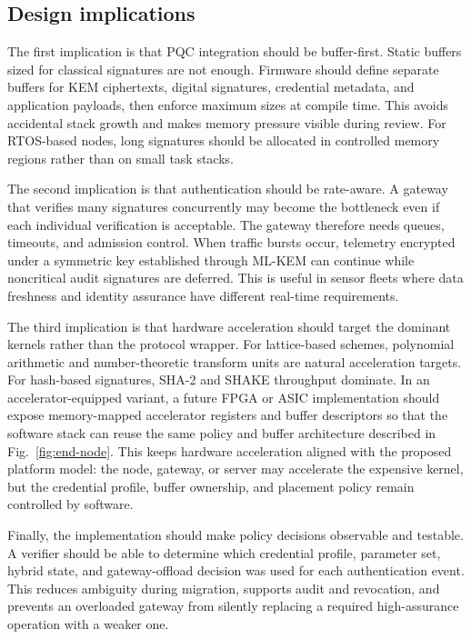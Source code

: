 \documentclass[conference,10pt,letterpaper]{IEEEtran}
\begin{document}
\subsection{Design implications}

The first implication is that PQC integration should be buffer-first. Static buffers sized for classical signatures are not enough. Firmware should define separate buffers for KEM ciphertexts, digital signatures, credential metadata, and application payloads, then enforce maximum sizes at compile time. This avoids accidental stack growth and makes memory pressure visible during review. For RTOS-based nodes, long signatures should be allocated in controlled memory regions rather than on small task stacks.

The second implication is that authentication should be rate-aware. A gateway that verifies many signatures concurrently may become the bottleneck even if each individual verification is acceptable. The gateway therefore needs queues, timeouts, and admission control. When traffic bursts occur, telemetry encrypted under a symmetric key established through ML-KEM can continue while noncritical audit signatures are deferred. This is useful in sensor fleets where data freshness and identity assurance have different real-time requirements.

The third implication is that hardware acceleration should target the dominant kernels rather than the protocol wrapper. For lattice-based schemes, polynomial arithmetic and number-theoretic transform units are natural acceleration targets. For hash-based signatures, SHA-2 and SHAKE throughput dominate. In an accelerator-equipped variant, a future FPGA or ASIC implementation should expose memory-mapped accelerator registers and buffer descriptors so that the software stack can reuse the same policy and buffer architecture described in Fig.~\ref{fig:end-node}. This keeps hardware acceleration aligned with the proposed platform model: the node, gateway, or server may accelerate the expensive kernel, but the credential profile, buffer ownership, and placement policy remain controlled by software.

Finally, the implementation should make policy decisions observable and testable. A verifier should be able to determine which credential profile, parameter set, hybrid state, and gateway-offload decision was used for each authentication event. This reduces ambiguity during migration, supports audit and revocation, and prevents an overloaded gateway from silently replacing a required high-assurance operation with a weaker one.
\end{document}
